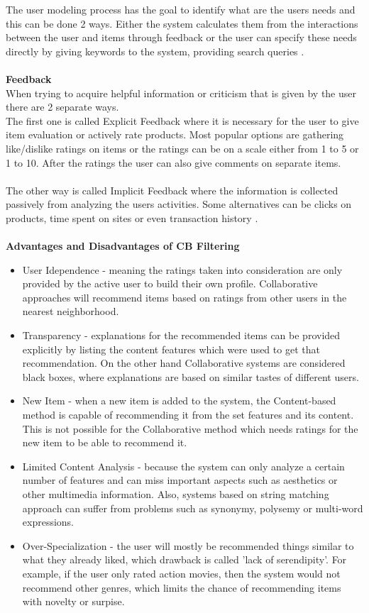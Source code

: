 \documentclass[\myFontSize,oneside,english,hidelinks,a4paper]{article}
\begin{document}
The user modeling process has the goal to identify what are the users needs and this can be done 2 ways. Either the system calculates them from the interactions between the user and items through feedback or the user can specify these needs directly by giving keywords to the system, providing search queries \cite{Beel2016305}. \\\\
%
%
\textbf{Feedback}\\
When trying to acquire helpful information or criticism that is given by the user there are 2 separate ways. \\
The first one is called Explicit Feedback where it is necessary for the user to give item evaluation or actively rate products. Most popular options are gathering like/dislike ratings on items or the ratings can be on a scale either from 1 to 5 or 1 to 10. After the ratings the user can also give comments on separate items. \\\\
The other way is called Implicit Feedback where the information is collected passively from analyzing the users activities. Some alternatives can be clicks on products, time spent on sites or even transaction history \cite{DeGemmis2015119}.\\\\
%
%
%
\textbf{Advantages and Disadvantages of CB Filtering}
\begin{itemize}
\item User Idependence - meaning the ratings taken into consideration are only provided by the active user to build their own profile. Collaborative approaches will recommend items based on ratings from other users in the nearest neighborhood.
\item Transparency - explanations for the recommended items can be provided explicitly by listing the content features which were used to get that recommendation. On the other hand Collaborative systems are considered black boxes, where explanations are based on similar tastes of different users.
\item New Item - when a new item is added to the system, the Content-based method is capable of recommending it from the set features and its content. This is not possible for the Collaborative method which needs ratings for the new item to be able to recommend it.
\item Limited Content Analysis - because the system can only analyze a certain number of features and can miss important aspects such as aesthetics or other multimedia information. Also, systems based on string matching approach can suffer from problems such as synonymy, polysemy or multi-word expressions.
\item Over-Specialization - the user will mostly be recommended things similar to what they already liked, which drawback is called 'lack of serendipity'. For example, if the user only rated action movies, then the system would not recommend other genres, which limits the chance of recommending items with novelty or surpise. \cite{DeGemmis2015119}\\
\end{itemize}
\end{document}
